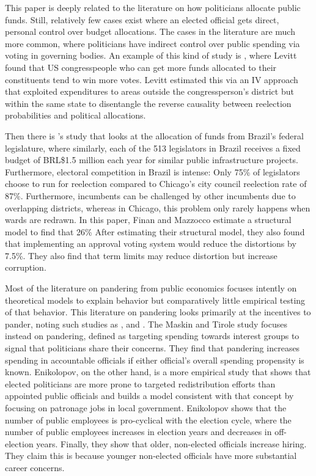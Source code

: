 This paper is deeply related to the literature on how politicians allocate public funds. Still, relatively few cases exist where an elected official gets direct, personal control over budget allocations. 
The cases in the literature are much more common, where politicians have indirect control over public spending via voting in governing bodies.
An example of this kind of study is \cite{levitt1997impact}, where Levitt found that US congresspeople who can get more funds allocated to their constituents tend to win more votes. 
Levitt estimated this via an IV approach that exploited expenditures to areas outside the congressperson's district but within the same state to disentangle the reverse causality between reelection probabilities and political allocations. 

Then there is \cite{finan2021electoral}'s study that looks at the allocation of funds from Brazil's federal legislature, where similarly, each of the 513 legislators in Brazil receives a fixed budget of BRL\$1.5 million each year for similar public infrastructure projects.  
Furthermore, electoral competition in Brazil is intense: Only 75\% of legislators choose to run for reelection compared to Chicago's city council reelection rate of 87\%.
Furthermore, incumbents can be challenged by other incumbents due to overlapping districts, whereas in Chicago, this problem only rarely happens when wards are redrawn.
In this paper, Finan and Mazzocco estimate a structural model to find that 26\% %
After estimating their structural model, they also found that implementing an approval voting system would reduce the distortions by 7.5\%. 
They also find that term limits may reduce distortion but increase corruption.

Most of the literature on pandering from public economics focuses intently on theoretical models to explain behavior but comparatively little empirical testing of that behavior. 
This literature on pandering looks primarily at the incentives to pander, noting such studies as \cite{MASKIN201979},  and \cite{ENIKOLOPOV201474}. 
The Maskin and Tirole study focuses instead on pandering, defined as targeting spending towards interest groups to signal that politicians share their concerns.
They find that pandering increases spending in accountable officials if either official's overall spending propensity is known. 
Enikolopov, on the other hand, is a more empirical study that shows that elected politicians are more prone to targeted redistribution efforts than appointed public officials and builds a model consistent with that concept by focusing on patronage jobs in local government. 
Enikolopov shows that the number of public employees is pro-cyclical with the election cycle, where the number of public employees increases in election years and decreases in off-election years. 
Finally, they show that older, non-elected officials increase hiring. 
They claim this is because younger non-elected officials have more substantial career concerns.

